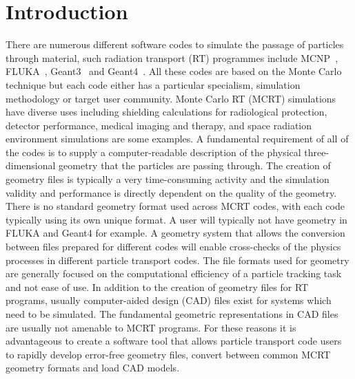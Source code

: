 \documentclass[final,5p,times,twocolumn]{elsarticle}
\begin{document}
\begin{small}

\end{small}

\section{Introduction} \label{sec:introduction}
There are numerous different software codes to simulate the passage of particles through material, such radiation transport (RT) programmes 
include MCNP~\cite{Mcnp_Werner}, FLUKA~\cite{Fluka_Ferrari,Fluka_Bohlen}, Geant3~\cite{Geant3_Brun} and Geant4~\cite{Geant4_Agostinelli}. 
All these codes are based on the Monte Carlo technique but each code either has a particular specialism, simulation methodology or target user community.  
 Monte Carlo RT (MCRT) simulations have diverse uses including shielding calculations for radiological protection, detector performance, medical 
imaging and therapy, and space radiation environment simulations are some examples. A fundamental requirement of all of the codes is to supply a 
computer-readable description of the  physical three-dimensional geometry that  the particles are passing through.  The creation of geometry files is 
typically a very time-consuming activity and the simulation validity and performance is directly dependent on the quality of the geometry. There is no 
standard geometry format used across MCRT codes, with each code typically using its own unique format. A user will typically not have geometry in FLUKA and Geant4 for example. A geometry system 
that allows the conversion between files prepared for different codes will enable cross-checks of the physics processes in different particle transport
 codes.  The file formats used for geometry are generally focused 
 on the computational efficiency of a particle tracking task and not ease of use. In addition to the creation of geometry files for RT programs, usually 
 computer-aided design (CAD) files exist for systems which need to be simulated. The fundamental geometric representations in CAD files are usually not 
 amenable to MCRT programs.  For these reasons it is advantageous to create a software tool that allows particle transport code users to rapidly develop 
 error-free geometry files, convert between common MCRT geometry formats and load CAD models.
\end{document}
